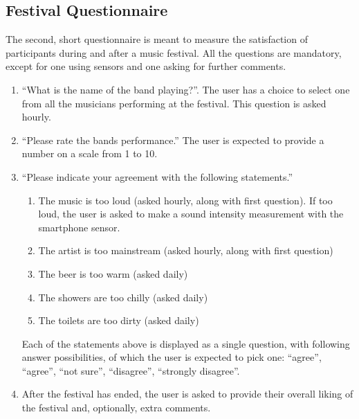 \subsection{Festival Questionnaire}
\label{subsec:festivalquestionnaire}
The second, short questionnaire is meant to measure the satisfaction of participants during and after a music festival. All the questions are mandatory, except for one using sensors and one asking for further comments.
\begin{enumerate}
\item ``What is the name of the band playing?''. The user has a choice to select one from all the musicians performing at the festival. This question is asked hourly.
\item ``Please rate the bands performance.'' The user is expected to provide a number on a scale from 1 to 10.
\item ``Please indicate your agreement with the following statements.''
\begin{enumerate}
\item The music is too loud (asked hourly, along with first question). If too loud, the user is asked to make a sound intensity measurement with the smartphone sensor.
\item The artist is too mainstream (asked hourly, along with first question)
\item The beer is too warm (asked daily)
\item The showers are too chilly (asked daily)
\item The toilets are too dirty (asked daily)
\end{enumerate} 
Each of the statements above is displayed as a single question, with following answer possibilities, of which the user is expected to pick one: ``agree'', ``agree'', ``not sure'', ``disagree'', ``strongly disagree''.
\item After the festival has ended, the user is asked to provide their overall liking of the festival and, optionally, extra comments.
\end{enumerate}

